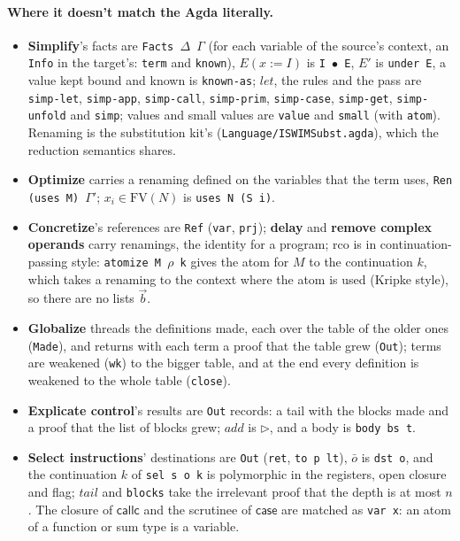 \documentclass[10pt]{article}
\theoremstyle{acmplain}
\newcommand{\key}[1]{\mathsf{#1}}
\newcommand{\pass}[1]{\mathit{#1}}
\newcommand{\FV}{\mathrm{FV}}
\newcommand{\ext}[3]{#1(#2{:=}#3)}
\begin{document}
\paragraph{Where it doesn't match the Agda literally.}
\begin{itemize}
\item \textbf{Simplify}'s facts are \texttt{Facts $\Delta$ $\Gamma$} (for each
  variable of the source's context, an \texttt{Info} in the target's:
  \texttt{term} and \texttt{known}), $\ext{E}{x}{I}$ is \texttt{I $\bullet$ E},
  $E'$ is \texttt{under E}, a value kept bound and known is \texttt{known-as};
  $\pass{let}$, the rules and the pass are \texttt{simp-let},
  \texttt{simp-app}, \texttt{simp-call}, \texttt{simp-prim},
  \texttt{simp-case}, \texttt{simp-get}, \texttt{simp-unfold} and
  \texttt{simp}; values and small values are \texttt{value} and
  \texttt{small} (with \texttt{atom}). Renaming is the substitution kit's
  (\texttt{Language/ISWIMSubst.agda}), which the reduction semantics
  shares.
\item \textbf{Optimize} carries a renaming defined on the variables that
  the term uses, \texttt{Ren (uses M) $\Gamma'$}; $x_i \in \FV(N)$ is
  \texttt{uses N (S i)}.
\item \textbf{Concretize}'s references are \texttt{Ref} (\texttt{var},
  \texttt{prj}); \textbf{delay} and \textbf{remove complex operands} carry
  renamings, the identity for a program; rco is in continuation-passing
  style: \texttt{atomize M $\rho$ k} gives the atom for $M$ to the
  continuation $k$, which takes a renaming to the context where the atom is
  used (Kripke style), so there are no lists $\vec{b}$.
\item \textbf{Globalize} threads the definitions made, each over the table
  of the older ones (\texttt{Made}), and returns with each term a proof that
  the table grew (\texttt{Out}); terms are weakened (\texttt{wk}) to the
  bigger table, and at the end every definition is weakened to the whole
  table (\texttt{close}).
\item \textbf{Explicate control}'s results are \texttt{Out} records: a tail
  with the blocks made and a proof that the list of blocks grew; $\pass{add}$
  is $\triangleright$, and a body is \texttt{body bs t}.
\item \textbf{Select instructions}' destinations are \texttt{Out} (\texttt{ret},
  \texttt{to p lt}), $\bar{o}$ is \texttt{dst o}, and the continuation $k$ of
  \texttt{sel s o k} is polymorphic in the registers, open closure and flag;
  $\pass{tail}$ and \texttt{blocks} take the irrelevant proof that the depth
  is at most $n$. The closure of $\key{callc}$ and the scrutinee of
  $\key{case}$ are matched as \texttt{var x}: an atom of a function or sum
  type is a variable.
\end{itemize}
\end{document}
